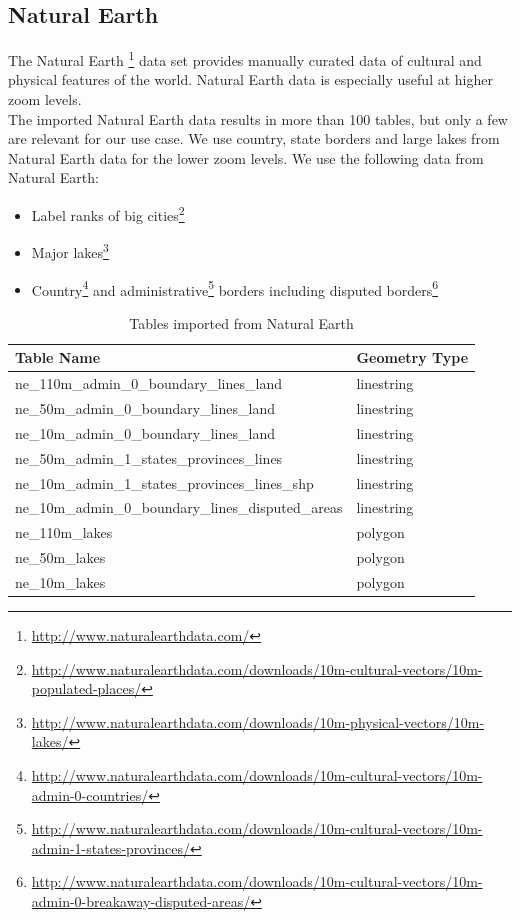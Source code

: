 \newpage
\subsection{Natural Earth}

The Natural Earth \footnote{\url{http://www.naturalearthdata.com/}} data set provides manually curated data of cultural and physical features of the world. Natural Earth data is especially useful at higher zoom levels.
\\
The imported Natural Earth data results in more than 100 tables, but only a few
are relevant for our use case.
We use country, state borders and large lakes from Natural Earth data for the lower zoom
levels.
We use the following data from Natural Earth:

\begin{itemize}
\item Label ranks of big cities\footnote{\url{http://www.naturalearthdata.com/downloads/10m-cultural-vectors/10m-populated-places/}}
\item Major lakes\footnote{\url{http://www.naturalearthdata.com/downloads/10m-physical-vectors/10m-lakes/}}
\item Country\footnote{\url{http://www.naturalearthdata.com/downloads/10m-cultural-vectors/10m-admin-0-countries/}} and administrative\footnote{\url{http://www.naturalearthdata.com/downloads/10m-cultural-vectors/10m-admin-1-states-provinces/}} borders including disputed borders\footnote{\url{http://www.naturalearthdata.com/downloads/10m-cultural-vectors/10m-admin-0-breakaway-disputed-areas/}}
\end{itemize}



\begin{table}[H]
\centering
    \begin{tabular}{ll}
    \hline
    Table Name                                          & Geometry Type \\
    \hline
    ne\_110m\_admin\_0\_boundary\_lines\_land           & linestring    \\
    ne\_50m\_admin\_0\_boundary\_lines\_land            & linestring    \\
    ne\_10m\_admin\_0\_boundary\_lines\_land            & linestring    \\
    ne\_50m\_admin\_1\_states\_provinces\_lines         & linestring    \\
    ne\_10m\_admin\_1\_states\_provinces\_lines\_shp    & linestring    \\
    ne\_10m\_admin\_0\_boundary\_lines\_disputed\_areas & linestring    \\
    ne\_110m\_lakes                                     & polygon       \\
    ne\_50m\_lakes                                      & polygon       \\
    ne\_10m\_lakes                                      & polygon       \\
    \end{tabular}
    \caption{Tables imported from Natural Earth}
\end{table}

